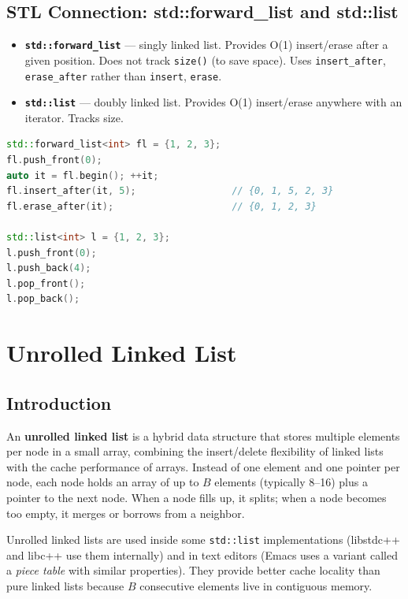 \subsection{STL Connection: std::forward\_list and std::list}

\begin{itemize}
\item \textbf{\texttt{std::forward\_list}} — singly linked list. Provides O(1) insert/erase after a given position. Does not track \texttt{size()} (to save space). Uses \texttt{insert\_after}, \texttt{erase\_after} rather than \texttt{insert}, \texttt{erase}.
\item \textbf{\texttt{std::list}} — doubly linked list. Provides O(1) insert/erase anywhere with an iterator. Tracks size.
\end{itemize}

\begin{lstlisting}[language=C++]
std::forward_list<int> fl = {1, 2, 3};
fl.push_front(0);
auto it = fl.begin(); ++it;
fl.insert_after(it, 5);                 // {0, 1, 5, 2, 3}
fl.erase_after(it);                     // {0, 1, 2, 3}

std::list<int> l = {1, 2, 3};
l.push_front(0);
l.push_back(4);
l.pop_front();
l.pop_back();
\end{lstlisting}

\bigskip

\section{Unrolled Linked List}

\subsection{Introduction}

An \textbf{unrolled linked list} is a hybrid data structure that stores multiple elements per node in a small array, combining the insert/delete flexibility of linked lists with the cache performance of arrays. Instead of one element and one pointer per node, each node holds an array of up to $B$ elements (typically 8--16) plus a pointer to the next node. When a node fills up, it splits; when a node becomes too empty, it merges or borrows from a neighbor.

Unrolled linked lists are used inside some \texttt{std::list} implementations (libstdc++ and libc++ use them internally) and in text editors (Emacs uses a variant called a \emph{piece table} with similar properties). They provide better cache locality than pure linked lists because $B$ consecutive elements live in contiguous memory.

